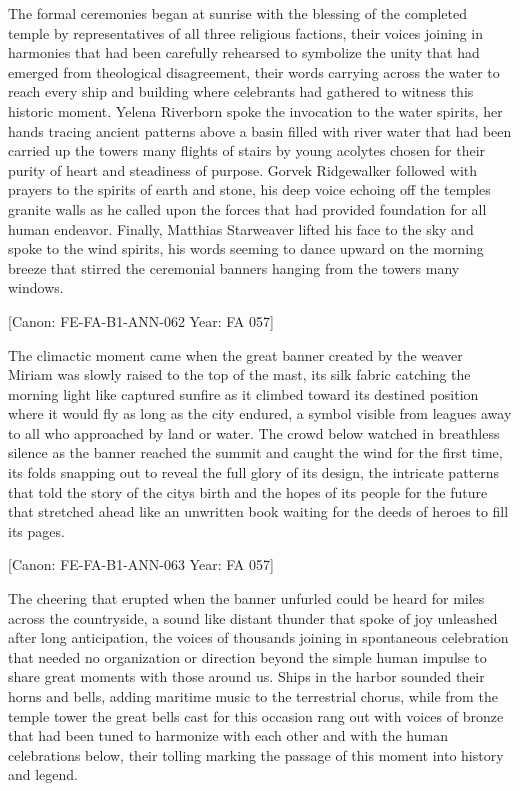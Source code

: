 The formal ceremonies began at sunrise with the blessing of the
completed temple by representatives of all three religious factions,
their voices joining in harmonies that had been carefully rehearsed to
symbolize the unity that had emerged from theological disagreement,
their words carrying across the water to reach every ship and building
where celebrants had gathered to witness this historic moment. Yelena
Riverborn spoke the invocation to the water spirits, her hands tracing
ancient patterns above a basin filled with river water that had been
carried up the tower\textquotesingle s many flights of stairs by young
acolytes chosen for their purity of heart and steadiness of purpose.
Gorvek Ridgewalker followed with prayers to the spirits of earth and
stone, his deep voice echoing off the temple\textquotesingle s granite
walls as he called upon the forces that had provided foundation for all
human endeavor. Finally, Matthias Starweaver lifted his face to the sky
and spoke to the wind spirits, his words seeming to dance upward on the
morning breeze that stirred the ceremonial banners hanging from the
tower\textquotesingle s many windows.

{[}Canon: FE-FA-B1-ANN-062 \textbar{} Year: FA 057{]}

The climactic moment came when the great banner created by the weaver
Miriam was slowly raised to the top of the mast, its silk fabric
catching the morning light like captured sunfire as it climbed toward
its destined position where it would fly as long as the city endured, a
symbol visible from leagues away to all who approached by land or water.
The crowd below watched in breathless silence as the banner reached the
summit and caught the wind for the first time, its folds snapping out to
reveal the full glory of its design, the intricate patterns that told
the story of the city\textquotesingle s birth and the hopes of its
people for the future that stretched ahead like an unwritten book
waiting for the deeds of heroes to fill its pages.

{[}Canon: FE-FA-B1-ANN-063 \textbar{} Year: FA 057{]}

The cheering that erupted when the banner unfurled could be heard for
miles across the countryside, a sound like distant thunder that spoke of
joy unleashed after long anticipation, the voices of thousands joining
in spontaneous celebration that needed no organization or direction
beyond the simple human impulse to share great moments with those around
us. Ships in the harbor sounded their horns and bells, adding maritime
music to the terrestrial chorus, while from the temple tower the great
bells cast for this occasion rang out with voices of bronze that had
been tuned to harmonize with each other and with the human celebrations
below, their tolling marking the passage of this moment into history and
legend.

